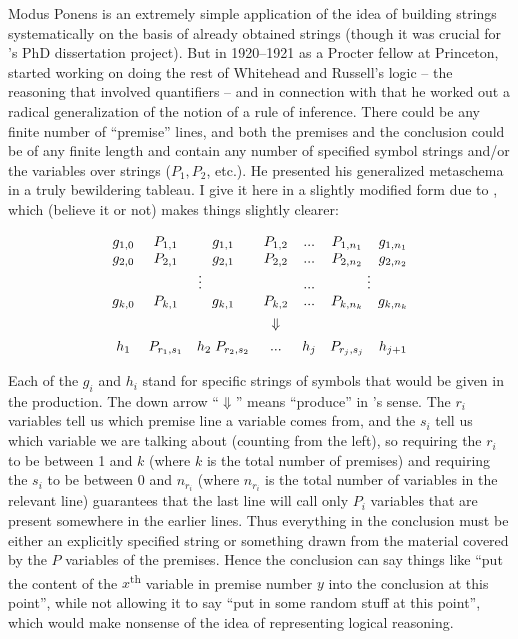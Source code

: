 \documentclass[output=paper]{langscibook}
\begin{document}
Modus Ponens is an extremely simple application of the idea of building strings systematically on the basis of already obtained strings (though it was crucial for {\Post}'s PhD dissertation project). But in 1920--1921 as a Procter fellow at Princeton, {\Post} started working on doing the rest of Whitehead and Russell's logic -- the reasoning that involved quantifiers -- and in connection with that he worked out a radical generalization of the notion of a rule of inference. There could be any finite number of ``premise'' lines, and both the premises and the conclusion could be of any finite length and contain any number of specified symbol strings and/or the variables over strings ($P_1, P_2$, etc.). He presented his generalized metaschema in a truly bewildering tableau. I give it here in a slightly modified form due to \citet{Davis82}, which (believe it or not) makes things slightly clearer:

\large
\begin{displaymath}
\begin{array}{ccccccc} g_{1,0} & P_{1,1} & g_{1,1} & P_{1,2}  & . . . & P_{1,n_1} & g_{1,n_1} \\ g_{2,0} & P_{2,1} & g_{2,1} & P_{2,2}  & . . . & P_{2,n_2} & g_{2,n_2} \\ \multicolumn{4}{c}{\vdots}             & . . . & \multicolumn{2}{c}{\vdots} \\ g_{k,0} & P_{k,1} & g_{k,1} & P_{k,2}  & . . . & P_{k,n_k} & g_{k,n_k}\\[1ex]         &         &         &\Downarrow&       &           & \\[1ex] h_1 & P_{r_1,s_1} & h_2 \; P_{r_2,s_2} & . . . & h_j & P_{r_j,s_j} & h_{j+1} \end{array} \end{displaymath}

\normalsize\smallskip\noindent  Each of the $g_i$ and $h_i$ stand for specific strings of symbols that would be given in the production. The down arrow ``$\Downarrow$'' means ``produce'' in {\Post}'s sense. The $r_i$ variables tell us which premise line a variable comes from, and the $s_i$ tell us which variable we are talking about (counting from the left), so requiring the $r_i$ to be between 1 and $k$ (where $k$ is the total number of premises) and requiring the $s_i$ to be between 0 and $n_{r_i}$ (where $n_{r_i}$ is the total number of variables in the relevant line) guarantees that the last line will call only $P_i$ variables that are present somewhere in the earlier lines. Thus everything in the conclusion must be either an explicitly specified string or something drawn from the material covered by the $P$ variables of the premises. Hence the conclusion can say things like ``put the content of the $x$\textsuperscript{th} variable in premise number $y$ into the conclusion at this point'', while not allowing it to say ``put in some random stuff at this point'', which would make nonsense of the idea of representing logical reasoning.
\end{document}
